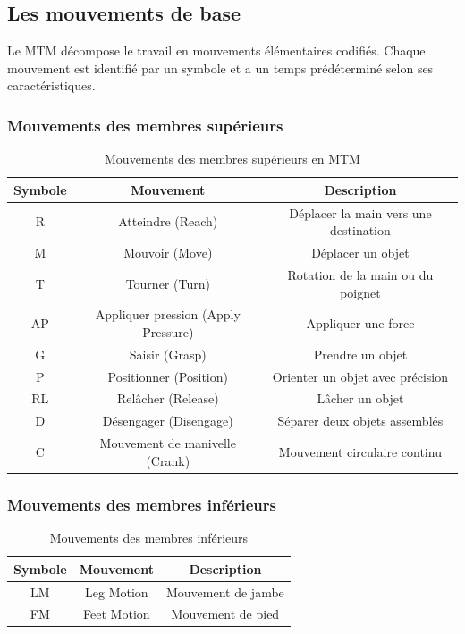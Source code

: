 \documentclass[a4paper,12pt]{article}
\begin{document}
\subsection{Les mouvements de base}

Le MTM décompose le travail en mouvements élémentaires codifiés. Chaque mouvement est identifié par un symbole et a un temps prédéterminé selon ses caractéristiques.

\subsubsection{Mouvements des membres supérieurs}

\begin{table}[ht]
\centering
\begin{tabular}{|c|c|c|}
\hline
\textbf{Symbole} & \textbf{Mouvement} & \textbf{Description} \\
\hline
R & Atteindre (Reach) & Déplacer la main vers une destination \\
M & Mouvoir (Move) & Déplacer un objet \\
T & Tourner (Turn) & Rotation de la main ou du poignet \\
AP & Appliquer pression (Apply Pressure) & Appliquer une force \\
G & Saisir (Grasp) & Prendre un objet \\
P & Positionner (Position) & Orienter un objet avec précision \\
RL & Relâcher (Release) & Lâcher un objet \\
D & Désengager (Disengage) & Séparer deux objets assemblés \\
C & Mouvement de manivelle (Crank) & Mouvement circulaire continu \\
\hline
\end{tabular}
\caption{Mouvements des membres supérieurs en MTM}
\end{table}

\subsubsection{Mouvements des membres inférieurs}

\begin{table}[ht]
\centering
\begin{tabular}{|c|c|c|}
\hline
\textbf{Symbole} & \textbf{Mouvement} & \textbf{Description} \\
\hline
LM & Leg Motion & Mouvement de jambe \\
FM & Feet Motion & Mouvement de pied \\
\hline
\end{tabular}
\caption{Mouvements des membres inférieurs}
\end{table}
\end{document}
